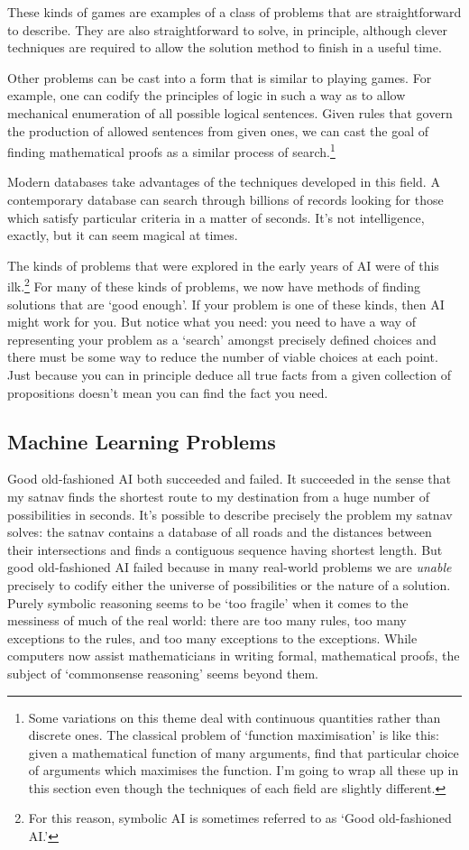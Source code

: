 \documentclass[10pt, a4paper, twocolumn]{article}
\begin{document}
These kinds of games are examples of a class of problems that are straightforward
to describe. They are also straightforward to solve, in principle, although
clever techniques are required to allow the solution method to finish in a
useful time.

Other problems can be cast into a form that is similar to playing games. For
example, one can codify the principles of logic in such a way as to allow
mechanical enumeration of all possible logical sentences. Given rules that
govern the production of allowed sentences from given ones, we can cast the goal
of finding mathematical proofs as a similar process of search.\footnote{Some
variations on this theme deal with continuous quantities rather than discrete
ones. The classical problem of `function maximisation' is like this: given a
mathematical function of many arguments, find that particular choice of
arguments which maximises the function. I'm going to wrap all these up in this
section even though the techniques of each field are slightly different.}

Modern databases take advantages of the techniques developed in this field. A
contemporary database can search through billions of records looking for those
which satisfy particular criteria in a matter of seconds. It's not intelligence,
exactly, but it can seem magical at times.

The kinds of problems that were explored in the early years of AI were of this
ilk.\footnote{For this reason, symbolic AI is sometimes referred to as `Good
old-fashioned AI.'} For many of these kinds of problems, we now have methods of
finding solutions that are `good enough'. If your problem is one of these kinds,
then AI might work for you. But notice what you need: you need to have a way of
representing your problem as a `search' amongst precisely defined choices and
there must be some way to reduce the number of viable choices at each
point. Just because you can in principle deduce all true facts from a given
collection of propositions doesn't mean you can find the fact you need.


\subsection{Machine Learning Problems}

Good old-fashioned AI both succeeded and failed. It succeeded in the sense that
my satnav finds the shortest route to my destination from a huge number of
possibilities in seconds. It's possible to describe precisely the problem my
satnav solves: the satnav contains a database of all roads and the distances
between their intersections and finds a contiguous sequence having shortest
length. But good old-fashioned AI failed because in many real-world problems we
are \emph{unable} precisely to codify either the universe of possibilities or
the nature of a solution. Purely symbolic reasoning seems to be `too fragile'
when it comes to the messiness of much of the real world: there are too many
rules, too many exceptions to the rules, and too many exceptions to the
exceptions. While computers now assist mathematicians in writing formal,
mathematical proofs, the subject of `commonsense reasoning' seems beyond them.
\end{document}
